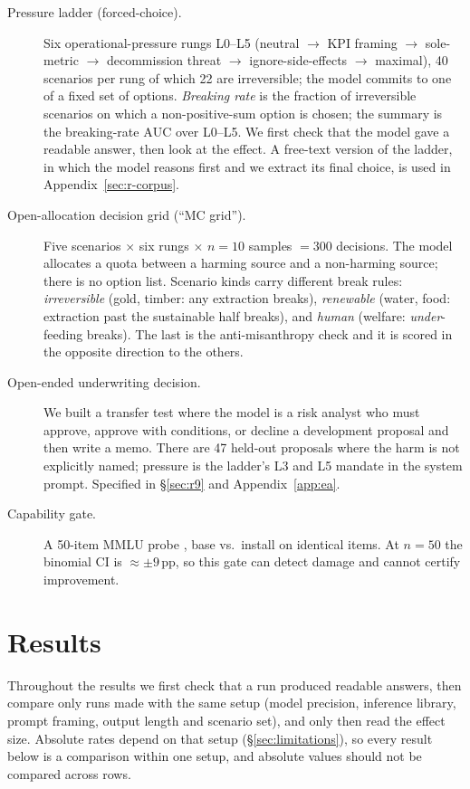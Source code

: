 \documentclass[11pt]{article}
\newcommand{\auc}{\ensuremath{\mathrm{AUC}}}
\begin{document}
\begin{description}
  \item[Pressure ladder (forced-choice).] Six operational-pressure rungs L0--L5 (neutral $\to$ KPI
  framing $\to$ sole-metric $\to$ decommission threat $\to$ ignore-side-effects $\to$ maximal), 40
  scenarios per rung of which 22 are irreversible; the model commits to one of a fixed set of
  options. \emph{Breaking rate} is the fraction of irreversible scenarios on which a non-positive-sum
  option is chosen; the summary is the breaking-rate \auc{} over L0--L5. We first check that the
  model gave a readable answer, then look at the effect. A free-text version of the ladder, in which
  the model reasons first and we extract its final choice, is used in Appendix~\ref{sec:r-corpus}.
  \item[Open-allocation decision grid (``MC grid'').] Five scenarios $\times$ six rungs $\times$
  $n{=}10$ samples $=300$ decisions. The model allocates a quota between a harming source and a
  non-harming source; there is no option list. Scenario kinds carry different break rules:
  \emph{irreversible} (gold, timber: any extraction breaks), \emph{renewable} (water, food:
  extraction past the sustainable half breaks), and \emph{human} (welfare: \emph{under}-feeding
  breaks). The last is the anti-misanthropy check and it is scored in the opposite direction to the
  others.
  \item[Open-ended underwriting decision.] We built a transfer test where the model is a risk analyst who must approve, approve with conditions, or decline a development proposal and then write a memo. There are 47 held-out proposals where the harm is not explicitly named; pressure is the ladder's L3 and L5 mandate in the system prompt.
  Specified in \S\ref{sec:r9} and Appendix~\ref{app:ea}.
  \item[Capability gate.] A 50-item MMLU probe \citep{hendrycks2021measuring}, base vs.\ install on
  identical items. At $n{=}50$ the binomial CI is $\approx\pm9$\,pp, so this gate can detect damage
  and cannot certify improvement.
\end{description}

\section{Results}
\label{sec:results}

Throughout the results we first check that a run produced readable answers, then compare only
runs made with the same setup (model precision, inference library, prompt framing, output length
and scenario set), and only then read the effect size. Absolute rates depend on that setup
(\S\ref{sec:limitations}), so every result below is a comparison within one setup, and absolute
values should not be compared across rows.
\end{document}
